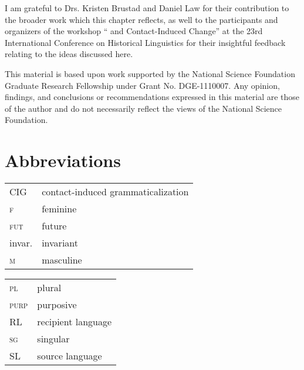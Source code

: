 \documentclass[output=paper]{langsci/langscibook}
\begin{document}
I am grateful to Drs. Kristen Brustad and Daniel Law for their contribution to the broader work which this chapter reflects, as well to the participants and organizers of the workshop “ and Contact-Induced Change” at the 23rd International Conference on Historical Linguistics for their insightful feedback relating to the ideas discussed here.

This material is based upon work supported by the National Science Foundation Graduate Research Fellowship under Grant No. DGE-1110007. Any opinion, findings, and conclusions or recommendations expressed in this material are those of the author and do not necessarily reflect the views of the National Science Foundation.

\section*{Abbreviations}
\begin{tabularx}{.6\textwidth}{@{}lQ@{}}
CIG & contact-induced grammaticalization\\
\textsc{f} & feminine \\
\textsc{fut} & {future} \\
invar. & invariant \\
\textsc{m} & masculine \\
\end{tabularx}%
\begin{tabularx}{.4\textwidth}{@{}lQ@{}}
\textsc{pl} & plural \\
\textsc{purp} & purposive \\
{RL} & {recipient language} \\
\textsc{sg} & singular \\
{SL} & {source language} \\
\end{tabularx}%

{\sloppy\printbibliography[heading=subbibliography,notkeyword=this]}
\end{document}
